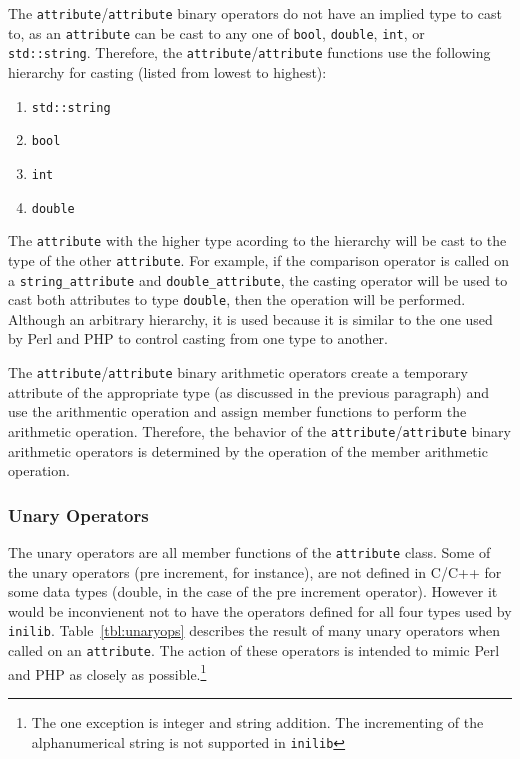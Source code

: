 The {\tt attribute}/{\tt attribute} binary operators do not have an
implied type to cast to, as an {\tt attribute} can be cast to any one
of {\tt bool}, {\tt double}, {\tt int}, or {\tt std::string}.
Therefore, the {\tt attribute}/{\tt attribute} functions use the
following hierarchy for casting (listed from lowest to highest):

\begin{enumerate}
\item {\tt std::string}
\item {\tt bool}
\item {\tt int}
\item {\tt double}
\end{enumerate}

The {\tt attribute} with the higher type acording to the hierarchy
will be cast to the type of the other {\tt attribute}.  For example,
if the comparison operator is called on a {\tt string\_attribute} and
{\tt double\_attribute}, the casting operator will be used to cast
both attributes to type {\tt double}, then the operation will be
performed.  Although an arbitrary hierarchy, it is used because it is
similar to the one used by Perl and PHP to control casting from one
type to another.

The {\tt attribute}/{\tt attribute} binary arithmetic operators create
a temporary attribute of the appropriate type (as discussed in the
previous paragraph) and use the arithmentic operation and assign
member functions to perform the arithmetic operation.  Therefore, the
behavior of the {\tt attribute}/{\tt attribute} binary arithmetic
operators is determined by the operation of the member arithmetic
operation.

\subsubsection{Unary Operators}

The unary operators are all member functions of the {\tt attribute}
class.  Some of the unary operators (pre increment, for instance), are
not defined in C/C++ for some data types ({double}, in the case of the
pre increment operator).  However it would be inconvienent not to have
the operators defined for all four types used by {\tt inilib}.
Table~\ref{tbl:unaryops} describes the result of many unary operators
when called on an {\tt attribute}.  The action of these operators is
intended to mimic Perl and PHP as closely as possible.\footnote{The one
  exception is integer and string addition.  The incrementing of the
  alphanumerical string is not supported in {\tt inilib}}

